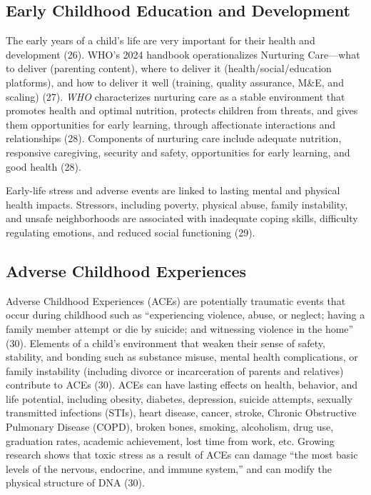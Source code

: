 \documentclass[
  english,
  letterpaper,
]{report}
\begin{document}
\subsection{Early Childhood Education and
Development}\label{early-childhood-education-and-development}

The early years of a child's life are very important for their health
and development (26). WHO's 2024 handbook operationalizes Nurturing
Care---what to deliver (parenting content), where to deliver it
(health/social/education platforms), and how to deliver it well
(training, quality assurance, M\&E, and scaling) (27). \emph{WHO}
characterizes nurturing care as a stable environment that promotes
health and optimal nutrition, protects children from threats, and gives
them opportunities for early learning, through affectionate interactions
and relationships (28). Components of nurturing care include adequate
nutrition, responsive caregiving, security and safety, opportunities for
early learning, and good health (28).

Early-life stress and adverse events are linked to lasting mental and
physical health impacts. Stressors, including poverty, physical abuse,
family instability, and unsafe neighborhoods are associated with
inadequate coping skills, difficulty regulating emotions, and reduced
social functioning (29).

\subsection{Adverse Childhood
Experiences}\label{adverse-childhood-experiences}

Adverse Childhood Experiences (ACEs) are potentially traumatic events
that occur during childhood such as ``experiencing violence, abuse, or
neglect; having a family member attempt or die by suicide; and
witnessing violence in the home'' (30). Elements of a child's
environment that weaken their sense of safety, stability, and bonding
such as substance misuse, mental health complications, or family
instability (including divorce or incarceration of parents and
relatives) contribute to ACEs (30). ACEs can have lasting effects on
health, behavior, and life potential, including obesity, diabetes,
depression, suicide attempts, sexually transmitted infections (STIs),
heart disease, cancer, stroke, Chronic Obstructive Pulmonary Disease
(COPD), broken bones, smoking, alcoholism, drug use, graduation rates,
academic achievement, lost time from work, etc. Growing research shows
that toxic stress as a result of ACEs can damage ``the most basic levels
of the nervous, endocrine, and immune system,'' and can modify the
physical structure of DNA (30).
\end{document}
